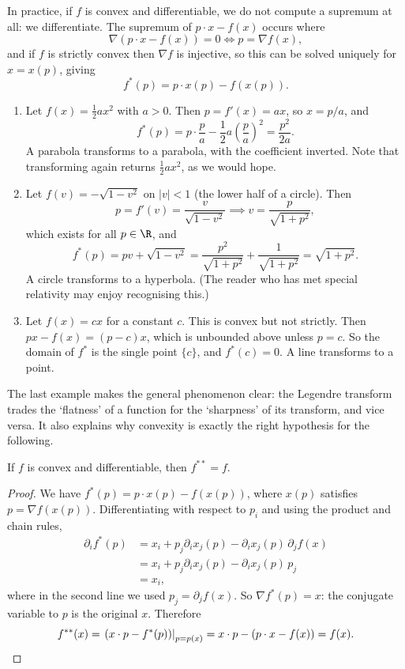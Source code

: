 In practice, if $f$ is convex and differentiable, we do not compute a supremum at all: we differentiate. The supremum of $p\cdot x - f(x)$ occurs where
$$
\nabla\left(p\cdot x - f(x)\right) = 0 \iff p = \nabla f(x),
$$
and if $f$ is strictly convex then $\nabla f$ is injective, so this can be solved uniquely for $x = x(p)$, giving
$$
f^*(p) = p\cdot x(p) - f(x(p)).
$$

\begin{example}\leavevmode
	\begin{enumerate}[label=(\roman*)]
		\item Let $f(x) = \frac{1}{2}ax^2$ with $a > 0$. Then $p = f'(x) = ax$, so $x = p/a$, and
		$$
		f^*(p) = p\cdot\frac{p}{a} - \frac{1}{2}a\left(\frac{p}{a}\right)^2 = \frac{p^2}{2a}.
		$$
		A parabola transforms to a parabola, with the coefficient inverted. Note that transforming again returns $\frac{1}{2}ax^2$, as we would hope.
		\item Let $f(v) = -\sqrt{1 - v^2}$ on $|v| < 1$ (the lower half of a circle). Then
		$$
		p = f'(v) = \frac{v}{\sqrt{1 - v^2}} \implies v = \frac{p}{\sqrt{1 + p^2}},
		$$
		which exists for all $p \in \R$, and
		$$
		f^*(p) = pv + \sqrt{1 - v^2} = \frac{p^2}{\sqrt{1+p^2}} + \frac{1}{\sqrt{1+p^2}} = \sqrt{1 + p^2}.
		$$
		A circle transforms to a hyperbola. (The reader who has met special relativity may enjoy recognising this.)
		\item Let $f(x) = cx$ for a constant $c$. This is convex but not strictly. Then $px - f(x) = (p - c)x$, which is unbounded above unless $p = c$. So the domain of $f^*$ is the single point $\{c\}$, and $f^*(c) = 0$. A line transforms to a point.
	\end{enumerate}
\end{example}

The last example makes the general phenomenon clear: the Legendre transform trades the `flatness' of a function for the `sharpness' of its transform, and vice versa. It also explains why convexity is exactly the right hypothesis for the following.

\begin{theorem}
	If $f$ is convex and differentiable, then $f^{**} = f$.
\end{theorem}
\begin{proof}
	We have $f^*(p) = p \cdot x(p) - f(x(p))$, where $x(p)$ satisfies $p = \nabla f(x(p))$. Differentiating with respect to $p_i$ and using the product and chain rules,
	\begin{align*}
		\partial_i f^*(p) &= x_i + p_j \partial_i x_j(p) - \partial_i x_j(p)\,\partial_j f(x) \\
		&= x_i + p_j \partial_i x_j(p) - \partial_i x_j(p)\, p_j \\
		&= x_i,
	\end{align*}
	where in the second line we used $p_j = \partial_j f(x)$. So $\nabla f^*(p) = x$: the conjugate variable to $p$ is the original $x$. Therefore
	\[
	f^{**}(x) = \left.\left(x\cdot p - f^*(p)\right)\right|_{p = p(x)} = x\cdot p - \left(p\cdot x - f(x)\right) = f(x). \qedhere
	\]
\end{proof}

